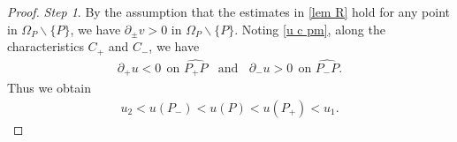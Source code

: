 \documentclass[10pt,leqno]{amsart}
\numberwithin{equation}{section}
\begin{document}
\begin{proof}
	{\textit{Step 1}}.	By the assumption that the estimates in \eqref{lem R} hold for any point in $\Omega_{P} \backslash \{P\}$, we have $\partial_{\pm}v> 0$ in $\Omega_{P} \backslash \{P\}$. Noting \eqref{u c pm}, along the characteristics $C_{+}$ and $C_{-}$, we have
	\begin{equation*} 
		\begin{aligned}
			\partial_{+} u  < 0 \ \ \text{on } \widehat{P_{+} P} \ \ \ \ \text{and} \ \ \ \	\partial_{-} u   > 0 \ \ \text{on } \widehat{P_{-} P}.
		\end{aligned}
	\end{equation*}	
	Thus we obtain 
	\begin{equation*} 
		\begin{aligned}
			u_2 < u(P_{-}) < u(P) < u(P_{+}) < u_1.
		\end{aligned}
	\end{equation*}	
	

\end{proof}
\end{document}
